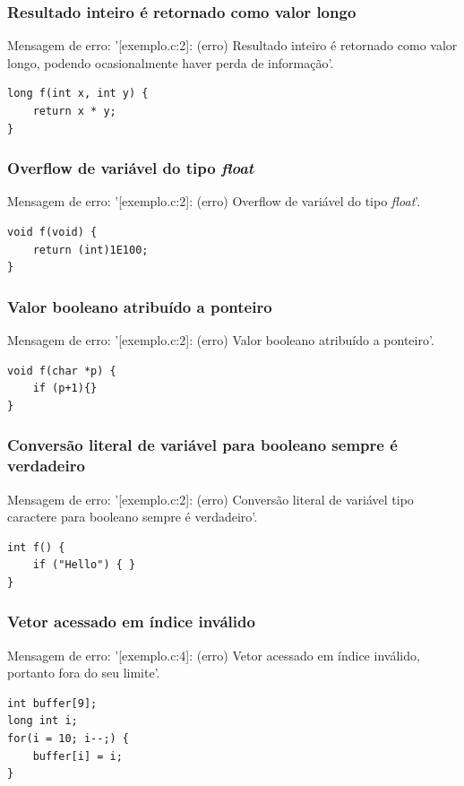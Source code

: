 \documentclass[12pt,a4paper]{report}
\begin{document}
\subsubsection{Resultado inteiro é retornado como valor longo}
Mensagem de erro: '[exemplo.c:2]: (erro) Resultado inteiro é retornado como valor longo, podendo ocasionalmente haver perda de informação'.
\begin{lstlisting}[style=CStyle]
long f(int x, int y) {
    return x * y;
}
\end{lstlisting}

\subsubsection{Overflow de variável do tipo \textit{float}}
Mensagem de erro: '[exemplo.c:2]: (erro) Overflow de variável do tipo \textit{float}'.
\begin{lstlisting}[style=CStyle]
void f(void) {
    return (int)1E100;
}
\end{lstlisting}

\subsubsection{Valor booleano atribuído a ponteiro}
Mensagem de erro: '[exemplo.c:2]: (erro) Valor booleano atribuído a ponteiro'.
\begin{lstlisting}[style=CStyle]
void f(char *p) {
    if (p+1){}
}
\end{lstlisting}

\subsubsection{Conversão literal de variável para booleano sempre é verdadeiro}
Mensagem de erro: '[exemplo.c:2]: (erro) Conversão literal de variável tipo caractere para booleano sempre é verdadeiro'.
\begin{lstlisting}[style=CStyle]
int f() {
    if ("Hello") { }
}
\end{lstlisting}

\subsubsection{Vetor acessado em índice inválido}
Mensagem de erro: '[exemplo.c:4]: (erro) Vetor acessado em índice inválido, portanto fora do seu limite'.
\begin{lstlisting}[style=CStyle]
int buffer[9];
long int i;
for(i = 10; i--;) {
    buffer[i] = i;
}
\end{lstlisting}
\end{document}
